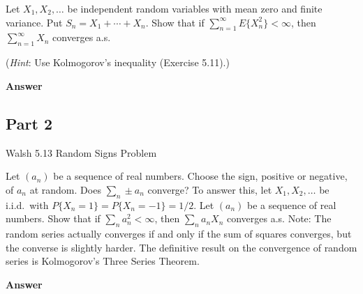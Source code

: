 \documentclass[letterpaper]{article}
\begin{document}
		Let $X_1,X_2,\ldots$ be independent random variables with mean zero and finite variance. Put $S_n=X_1+\cdots+X_n$. Show that if $\sum_{n=1}^{\infty} E\{X_n^2\}<\infty$, then $\sum_{n=1}^{\infty} X_n$ converges a.s.
		
		
		
		(\emph{Hint}: Use Kolmogorov's inequality (Exercise 5.11).)
		
		
		\textbf{Answer}
		
		\clearpage
		
		\subsection{Part 2}
		{\color{deepred}  Walsh 5.13 Random Signs Problem}
		
		Let $(a_n)$ be a sequence of real numbers. Choose the sign, positive or negative, of $a_n$ at random. Does $\sum_n \pm a_n$ converge? To answer this, let $X_1,X_2,\ldots$ be i.i.d.\ with $P\{X_n=1\}=P\{X_n=-1\}=1/2$. Let $(a_n)$ be a sequence of real numbers. Show that if $\sum_n a_n^2<\infty$, then $\sum_n a_n X_n$ converges a.s. Note: The random series actually converges if and only if the sum of squares converges, but the converse is slightly harder. The definitive result on the convergence of random series is Kolmogorov's Three Series Theorem.
		
		
		\textbf{Answer} 
		
		
		
		\clearpage
		
		
		
		
	
\end{document}
